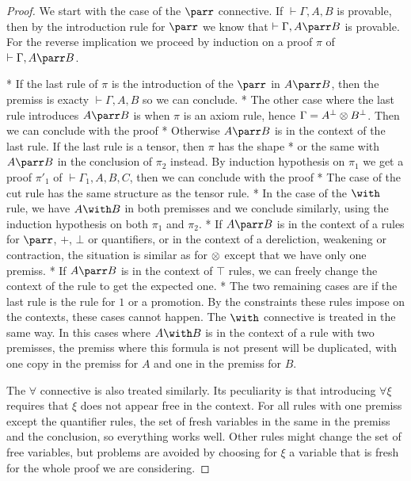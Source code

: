 \begin{proof}
We start with the case of the $\parr$ connective.
If $\vdash\Gamma,A,B$ is provable, then by the introduction rule for $\parr$
we know that $\vdash\Gamma,A\parr B$ is provable.
For the reverse implication we proceed by induction on a proof $\pi$ of
$\vdash\Gamma,A\parr B$.

* If the last rule of $\pi$ is the introduction of the $\parr$ in $A\parr B$, then the premiss is exacty $\vdash\Gamma,A,B$ so we can conclude.
* The other case where the last rule introduces $A\parr B$ is when $\pi$ is an axiom rule, hence $\Gamma=A^\bot\otimes B^\bot$. Then we can conclude with the proof
* Otherwise $A\parr B$ is in the context of the last rule. If the last rule is a tensor, then $\pi$ has the shape
* or the same with $A\parr B$ in the conclusion of $\pi_2$ instead. By induction hypothesis on $\pi_1$ we get a proof $\pi'_1$ of $\vdash\Gamma_1,A,B,C$, then we can conclude with the proof
* The case of the cut rule has the same structure as the tensor rule.
* In the case of the $\with$ rule, we have $A\with B$ in both premisses and we conclude similarly, using the induction hypothesis on both $\pi_1$ and $\pi_2$.
* If $A\parr B$ is in the context of a rules for $\parr$, $\plus$, $\bot$ or quantifiers, or in the context of a dereliction, weakening or contraction, the situation is similar as for $\otimes$ except that we have only one premiss.
* If $A\parr B$ is in the context of $\top$ rules, we can freely change the context of the rule to get the expected one.
* The two remaining cases are if the last rule is the rule for $1$ or a promotion. By the constraints these rules impose on the contexts, these cases cannot happen.
The $\with$ connective is treated in the same way.
In this cases where $A\with B$ is in the context of a rule with two
premisses, the premiss where this formula is not present will be duplicated,
with one copy in the premiss for $A$ and one in the premiss for $B$.

The $\forall$ connective is also treated similarly.
Its peculiarity is that introducing $\forall\xi$ requires that $\xi$ does
not appear free in the context.
For all rules with one premiss except the quantifier rules, the set of fresh
variables in the same in the premiss and the conclusion, so everything works
well.
Other rules might change the set of free variables, but problems are avoided
by choosing for $\xi$ a variable that is fresh for the whole proof we are considering.
\end{proof}

